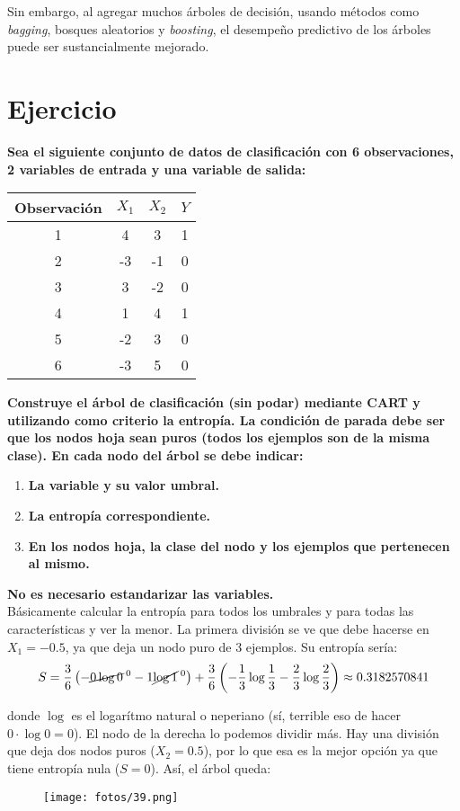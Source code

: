 Sin embargo, al agregar muchos árboles de decisión, usando métodos como \textit{bagging}, bosques aleatorios y \textit{boosting}, el desempeño predictivo de los árboles puede ser sustancialmente mejorado. 

\section{Ejercicio}

\begin{example}
\textbf{Sea el siguiente conjunto de datos de clasificación con 6 observaciones, 2 variables de entrada y una variable de salida:}
\begin{table}[H]
\centering
\begin{tabular}{cccc}
\hline \hline
Observación & $X_1$ & $X_2$ & $Y$ \\ \hline \hline
1 & 4 & 3 & 1 \\
2 & -3 & -1 & 0 \\
3 & 3 & -2 & 0 \\
4 & 1 & 4 & 1 \\
5 & -2 & 3 & 0 \\
6 & -3 & 5 & 0 \\ \hline
\end{tabular}
\end{table}
\textbf{Construye el árbol de clasificación (sin podar) mediante CART y utilizando como criterio la entropía. La condición de parada debe ser que los nodos hoja sean puros (todos los ejemplos son de la misma clase). En cada nodo del árbol se debe indicar:}
\begin{enumerate}
\item \textbf{La variable y su valor umbral.}
\item \textbf{La entropía correspondiente.}
\item \textbf{En los nodos hoja, la clase del nodo y los ejemplos que pertenecen al mismo.}
\end{enumerate}
\textbf{No es necesario estandarizar las variables.} \\

Básicamente calcular la entropía para todos los umbrales y para todas las características y ver la menor. La primera división se ve que debe hacerse en $X_1 = -0.5$, ya que deja un nodo puro de 3 ejemplos. Su entropía sería:
\begin{equation}
S = \frac{3}{6}\left(-\cancel{0\log 0}^{\; 0} - 1\cancel{\log 1}^{\; 0}\right) + \frac{3}{6}\left(-\frac{1}{3}\log \frac{1}{3} - \frac{2}{3}\log \frac{2}{3}\right) \approx 0.3182570841
\end{equation}

donde $\log$ es el logarítmo natural o neperiano (sí, terrible eso de hacer $0\cdot \log 0 = 0$). El nodo de la derecha lo podemos dividir más. Hay una división que deja dos nodos puros ($X_2 = 0.5$), por lo que esa es la mejor opción ya que tiene entropía nula ($S = 0$). Así, el árbol queda:
\begin{figure}[H]
\centering
\texttt{[image: fotos/39.png]}
\end{figure}
\end{example}